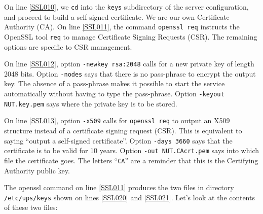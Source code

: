 \documentclass[12pt]{article}
\newcommand{\li}{\item}                 %
\begin{document}
\li On line \ref{SSL010}, we \texttt{cd} into the \texttt{keys} subdirectory
of the server configuration, and proceed to build a self-signed
certificate. We are our own Certificate Authority (CA).  On line \ref{SSL011},
the command \texttt{openssl req} instructs the OpenSSL tool \texttt{req} to
manage Certificate Signing Requests (CSR).  The remaining options are specific
to CSR management.

On line \ref{SSL012}, option \texttt{-newkey rsa:2048} calls for a new private
key of length 2048 bits.  Option \texttt{-nodes} says that there is no
pass-phrase to encrypt the output key.  The absence of a pass-phrase makes it
possible to start the service automatically without having to type the
pass-phrase. Option \texttt{-keyout NUT.key.pem} says where the private key
is to be stored.

On line \ref{SSL013}, option \texttt{-x509} calls for \texttt{openssl req} to
output an X509 structure instead of a certificate signing request (CSR).  This
is equivalent to saying ``output a self-signed certificate''.  Option
\texttt{-days 3660} says that the certificate is to be valid for 10
years. Option \texttt{-out NUT.CAcrt.pem} says into which file the certificate
goes.  The letters ``\texttt{CA}'' are a reminder that this is the Certifying
Authority public key.

\li The openssl command on line \ref{SSL011} produces the two files in
directory \texttt{/etc/ups/keys} shown on lines \ref{SSL020} and \ref{SSL021}.
Let's look at the contents of these two files:
\end{document}
